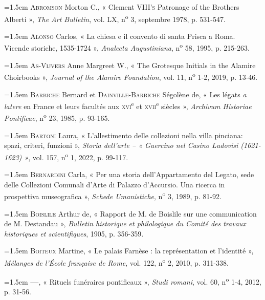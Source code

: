 \documentclass[12pt,twoside,openany]{book}
\newenvironment{PurhBibliography}
  {%
    \par
    \setlength{\parindent}{0pt}%
    \setlength{\leftskip}{0pt}%
  }
  {%
    \par
  }
\begin{document}
\begin{PurhBibliography}
\noindent\hangindent=1.5em \textsc{Abromson} Morton C., « Clement \textsc{VIII’s} Patronage of the Brothers Alberti », \textit{The Art Bulletin}, vol. \textsc{LX}, n\textsuperscript{o} 3, septembre 1978, p. 531-547.\par
\noindent\hangindent=1.5em \textsc{Alonso} Carlos, « La chiesa e il convento di santa Prisca a Roma. Vicende storiche, 1535-1724 », \textit{Analecta Augustiniana}, n\textsuperscript{o} 58, 1995, p. 215-263.\par
\noindent\hangindent=1.5em \textsc{As}-\textsc{Vijvers} Anne Margreet W., « The Grotesque Initials in the Alamire Choirbooks », \textit{Journal of the Alamire Foundation}, vol. 11, n\textsuperscript{o} 1‑2, 2019, p. 13‑46.\par
\noindent\hangindent=1.5em \textsc{Barbiche} Bernard et \textsc{Dainville}-\textsc{Barbiche} Ségolène de, « Les légats \textit{a latere} en France et leurs facultés aux \textsc{xvi}\textsuperscript{e} et \textsc{xvii}\textsuperscript{e} siècles », \textit{Archivum Historiae Pontificae}, n\textsuperscript{o} 23, 1985, p. 93-165.\par
\noindent\hangindent=1.5em \textsc{Bartoni} Laura, « L’allestimento delle collezioni nella villa pinciana: spazi, criteri, funzioni », \textit{Storia dell’arte – « Guercino nel Casino Ludovisi (1621-1623) »}, vol. 157, n\textsuperscript{o} 1, 2022, p. 99-117.\par
\noindent\hangindent=1.5em \textsc{Bernardini} Carla, « Per una storia dell’Appartamento del Legato, sede delle Collezioni Comunali d’Arte di Palazzo d’Accursio. Una ricerca in prospettiva museografica », \textit{Schede Umanistiche}, n\textsuperscript{o} 3, 1989, p. 81-92.\par
\noindent\hangindent=1.5em \textsc{Boislile} Arthur de, « Rapport de M. de Boislile sur une communication de M. Destandau », \textit{Bulletin historique et philologique du Comité des travaux historiques et scientifiques}, 1905, p. 356-359.\par
\noindent\hangindent=1.5em \textsc{Boiteux} Martine, « Le palais Farnèse : la représentation et l’identité », \textit{Mélanges de l’École française de Rome}, vol. 122, n\textsuperscript{o} 2, 2010, p. 311-338.\par
\noindent\hangindent=1.5em \textbf{—}, « Rituels funéraires pontificaux », \textit{Studi romani}, vol. 60, n\textsuperscript{o} 1-4, 2012, p. 31-56.\par

\end{PurhBibliography}
\end{document}
